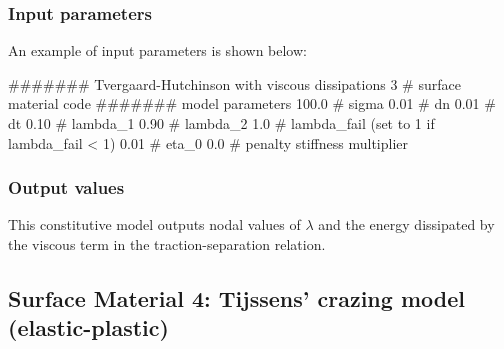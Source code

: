 \subsubsection{Input parameters}
An example of input parameters is shown below:
\begin{inputfile}
####### Tvergaard-Hutchinson with viscous dissipations
3     # surface material code
####### model parameters
100.0 # sigma
0.01  # dn
0.01  # dt
0.10  # lambda_1
0.90  # lambda_2
1.0   # lambda_fail (set to 1 if lambda_fail < 1)
0.01  # eta_0
0.0   # penalty stiffness multiplier
\end{inputfile}

\subsubsection{Output values}
This constitutive model outputs nodal values of $\lambda$ and the energy dissipated
by the viscous term in the traction-separation relation.

\subsection{Surface Material 4: Tijssens' crazing model (elastic-plastic)}
\label{sect.material.surface.tij}

